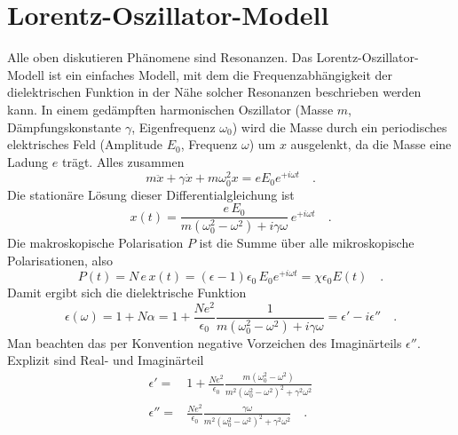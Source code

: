 \section{Lorentz-Oszillator-Modell}


\begin{marginfigure}

\caption{Frequenzabhängigkeit des Real- und Imaginärteils des Lorentz-Oszillators. Real- und  Imaginärteil des komplexwertigen Brechungsindex $\tilde{n}$ sehen qualitativ gleich aus. \label{fig:diel_lorentz}}
\end{marginfigure}

Alle oben diskutieren Phänomene sind Resonanzen. Das Lorentz-Oszillator-Modell ist ein einfaches Modell, mit dem die Frequenzabhängigkeit der dielektrischen Funktion in der Nähe solcher Resonanzen beschrieben werden kann. In einem gedämpften harmonischen Oszillator (Masse $m$, Dämpfungskonstante $\gamma$, Eigenfrequenz $\omega_0$) wird die Masse durch ein periodisches elektrisches Feld (Amplitude $E_0$, Frequenz $\omega$) um $x$ ausgelenkt, da die Masse eine Ladung $e$ trägt. Alles zusammen
\begin{equation}
 m \ddot{x} +  \gamma \dot{x} + m \omega_0^2  x = e E_0 e^{+ i \omega t} \quad .
\end{equation}
Die stationäre Lösung dieser Differentialgleichung ist
\begin{equation}
 x(t) =  \frac{e \, E_0}{m (\omega_0^2  - \omega^2) + i \gamma \omega} \, e^{+ i \omega t} \quad .
\end{equation}
Die makroskopische Polarisation $P$ ist die Summe über alle mikroskopische Polarisationen, also
\begin{equation}
P(t) = N \, e \,x(t) =  (\epsilon -1 ) \epsilon_0 \, E_0 e^{+ i \omega t}
= \chi \epsilon_0 E(t) \quad .
\end{equation}
Damit ergibt sich die dielektrische Funktion
\begin{equation}
\epsilon(\omega) = 1 + N \alpha = 1 +\frac{N e^2}{\epsilon_0} \frac{1}{m (\omega_0^2  - \omega^2) + i \gamma \omega} = \epsilon' - i \epsilon'' \quad .
\end{equation}
Man beachten das per Konvention negative Vorzeichen des Imaginärteils $\epsilon''$. Explizit sind Real- und Imaginärteil
\begin{align}
 \epsilon' = & 1 + \frac{N e^2}{\epsilon_0} \frac{ m (\omega_0^2  - \omega^2)}{m^2 (\omega_0^2  - \omega^2)^2 +  \gamma^2 \omega^2}  \\
  \epsilon'' = &  \frac{N e^2}{\epsilon_0} \frac{ \gamma \omega }{m^2 (\omega_0^2  - \omega^2)^2 +  \gamma^2 \omega^2}  \quad .
\end{align}
